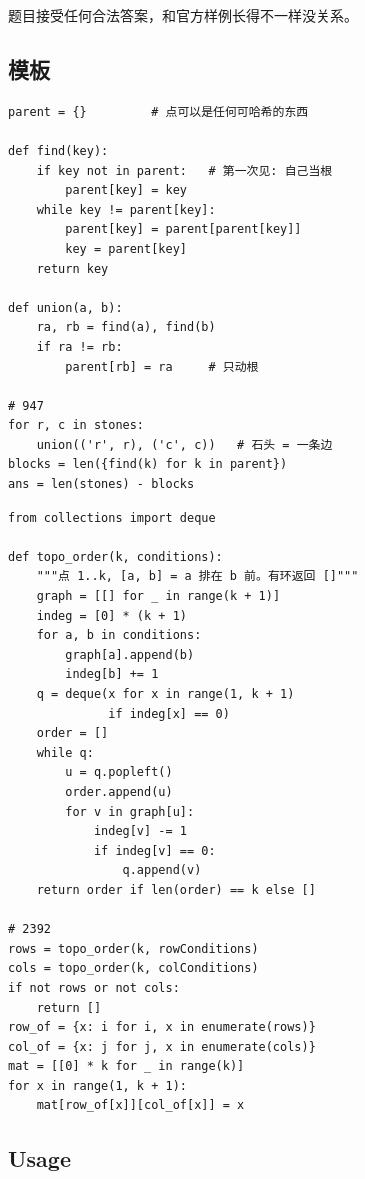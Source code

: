 题目接受任何合法答案，和官方样例长得不一样没关系。

\subsection{模板}

\begin{minipage}[t]{0.47\linewidth}
\begin{lstlisting}
parent = {}         # 点可以是任何可哈希的东西

def find(key):
    if key not in parent:   # 第一次见: 自己当根
        parent[key] = key
    while key != parent[key]:
        parent[key] = parent[parent[key]]
        key = parent[key]
    return key

def union(a, b):
    ra, rb = find(a), find(b)
    if ra != rb:
        parent[rb] = ra     # 只动根

# 947
for r, c in stones:
    union(('r', r), ('c', c))   # 石头 = 一条边
blocks = len({find(k) for k in parent})
ans = len(stones) - blocks
\end{lstlisting}
\end{minipage}\hfill
\begin{minipage}[t]{0.51\linewidth}
\begin{lstlisting}
from collections import deque

def topo_order(k, conditions):
    """点 1..k, [a, b] = a 排在 b 前。有环返回 []"""
    graph = [[] for _ in range(k + 1)]
    indeg = [0] * (k + 1)
    for a, b in conditions:
        graph[a].append(b)
        indeg[b] += 1
    q = deque(x for x in range(1, k + 1)
              if indeg[x] == 0)
    order = []
    while q:
        u = q.popleft()
        order.append(u)
        for v in graph[u]:
            indeg[v] -= 1
            if indeg[v] == 0:
                q.append(v)
    return order if len(order) == k else []

# 2392
rows = topo_order(k, rowConditions)
cols = topo_order(k, colConditions)
if not rows or not cols:
    return []
row_of = {x: i for i, x in enumerate(rows)}
col_of = {x: j for j, x in enumerate(cols)}
mat = [[0] * k for _ in range(k)]
for x in range(1, k + 1):
    mat[row_of[x]][col_of[x]] = x
\end{lstlisting}
\end{minipage}

\subsection{Usage}

